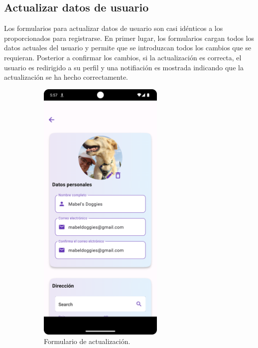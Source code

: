 \documentclass[a4paper, 12pt]{article}
\begin{document}
\newpage
\subsection*{Actualizar datos de usuario}

Los formularios para actualizar datos de usuario son casi idénticos a los proporcionados para registrarse. En primer lugar, los formularios cargan todos los datos actuales del usuario y permite que se introduzcan todos los cambios que se requieran. Posterior a confirmar los cambios, si la actualización es correcta, el usuario es redirigido a su perfil y una notifiación es mostrada indicando que la actualización se ha hecho correctamente.

\begin{figure}[H]
   	\begin{subfigure}{0.48\textwidth}
		\begin{center}
			{\includegraphics[width=6cm]{app/UserUpdate.png}\par}
			\caption{Formulario de actualización.}
		\end{center}  
	\end{subfigure}\hfill
   	\begin{subfigure}{0.48\textwidth}
		\begin{center}

\end{center}
\end{subfigure}
\end{figure}
\end{document}
